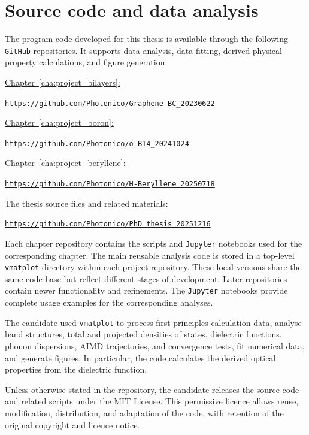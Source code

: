 \chapter{Source code and data analysis}
\label{cha:appendix_code}

The program code developed for this thesis is available through the following \texttt{GitHub} repositories.
It supports data analysis, data fitting,
derived physical-property calculations, and figure generation.

\hyperref[cha:project_bilayers]{Chapter~\ref*{cha:project_bilayers}: }
\cite{niu2024electronic}

\quad\href{https://github.com/Photonico/Graphene-BC_20230622}
{\texttt{https://github.com/Photonico/Graphene-BC\_20230622}}

\hyperref[cha:project_boron]{Chapter~\ref*{cha:project_boron}: }
\cite{niu2026superconductivity}

\quad\href{https://github.com/Photonico/o-B14_20241024}
{\texttt{https://github.com/Photonico/o-B14\_20241024}}

\hyperref[cha:project_beryllene]{Chapter~\ref*{cha:project_beryllene}: }
\cite{niu2026draftemergent}

\quad\href{https://github.com/Photonico/H-Beryllene_20250718}
{\texttt{https://github.com/Photonico/H-Beryllene\_20250718}}

The thesis source files and related materials:

\quad\href{https://github.com/Photonico/PhD_thesis_20251216}
{\texttt{https://github.com/Photonico/PhD\_thesis\_20251216}}

Each chapter repository contains the scripts and \texttt{Jupyter} notebooks used for the corresponding chapter.
The main reusable analysis code is stored in a top-level \texttt{vmatplot} directory within each project repository.
These local versions share the same code base but reflect different stages of development.
Later repositories contain newer functionality and refinements.
The \texttt{Jupyter} notebooks provide complete usage examples for the corresponding analyses.

The candidate used \texttt{vmatplot} to process first-principles calculation data,
analyse band structures, total and projected densities of states, dielectric functions, phonon dispersions, AIMD trajectories, and convergence tests, fit numerical data, and generate figures.
In particular, the code calculates the derived optical properties from the dielectric function.

Unless otherwise stated in the repository,
the candidate releases the source code and related scripts under the MIT License.
This permissive licence allows reuse, modification, distribution, and adaptation of the code,
with retention of the original copyright and licence notice.
